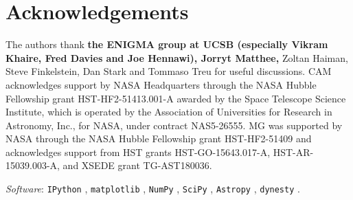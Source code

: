 \documentclass[fleqn,usenatbib]{mnras}
\providecommand{\DIFadd}[1]{{\protect\color{Green} \bf #1}} %
\providecommand{\DIFaddbegin}{} %
\providecommand{\DIFaddend}{} %
\newcommand{\DIFaddincludegraphics}[2][]{{\color{blue}\fbox{\DIFOincludegraphics[#1]{#2}}}} %
\DeclareRobustCommand{\DIFaddbegin}{\DIFOaddbegin \let\includegraphics\DIFaddincludegraphics} %
\DeclareRobustCommand{\DIFaddend}{\DIFOaddend \let\includegraphics\DIFOincludegraphics} %
\begin{document}
\section*{Acknowledgements}

The authors thank \DIFaddbegin \DIFadd{the ENIGMA group at UCSB (especially Vikram Khaire, Fred Davies and Joe Hennawi), Jorryt Matthee, }\DIFaddend Zoltan Haiman, Steve Finkelstein, Dan Stark and Tommaso Treu for useful discussions. CAM acknowledges support by NASA Headquarters through the NASA Hubble Fellowship grant HST-HF2-51413.001-A awarded by the Space Telescope Science Institute, which is operated by the Association of Universities for Research in Astronomy, Inc., for NASA, under contract NAS5-26555. MG was supported by NASA through the NASA Hubble Fellowship grant HST-HF2-51409 and acknowledges support from HST grants HST-GO-15643.017-A, HST-AR-15039.003-A, and XSEDE grant TG-AST180036.

\noindent
\textit{Software}: \verb|IPython| \citep{Perez2007a}, \verb|matplotlib| \citep{Hunter2007a}, \verb|NumPy| \citep{VanderWalt2011a}, \verb|SciPy| \citep{Oliphant2007a}, \verb|Astropy| \citep{Robitaille2013}, \verb|dynesty| \citep{Speagle2019}.







\bsp	%
\label{lastpage}
\end{document}

